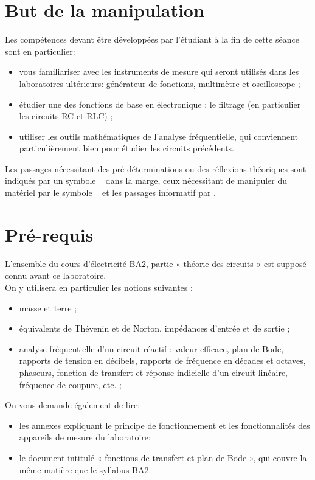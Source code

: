 \documentclass{../template/tp}
\author{The Fantastic Four} %
\begin{document}

\section{But de la manipulation}

Les compétences devant être développées par l'étudiant à la fin de cette séance sont en particulier:
\begin{itemize}
	\item vous familiariser avec les instruments de mesure qui seront utilisés dans les laboratoires ultérieurs: générateur de fonctions, multimètre et oscilloscope ;
	\item étudier une des fonctions de base en électronique : le filtrage (en particulier les circuits RC et RLC) ;
	\item utiliser les outils mathématiques de l'analyse fréquentielle, qui conviennent particulièrement bien pour étudier les
circuits précédents.
\end{itemize}


Les passages nécessitant des pré-déterminations ou des réflexions théoriques sont indiqués par un symbole \faCogs~ dans la marge,
ceux nécessitant de manipuler du matériel par le symbole \faFlask~ et les passages informatif par \faLightbulbO.

\section{Pré-requis}
L'ensemble du cours d'électricité BA2, partie « théorie des circuits » est supposé connu avant ce laboratoire.\\
On y utilisera en particulier les notions suivantes :
\begin{itemize}
\item masse et terre ; %
\item équivalents de Thévenin et de Norton, impédances d'entrée et de sortie ; %
\item analyse fréquentielle d'un circuit réactif : valeur efficace, plan de Bode, rapports de tension en
décibels, rapports de fréquence en décades et octaves, phaseurs, fonction de transfert et réponse indicielle d'un
circuit linéaire, fréquence de coupure, etc. ; %
\end{itemize}
On vous demande également de lire:
\begin{itemize}
\item les annexes expliquant le principe de fonctionnement et les fonctionnalités des appareils de mesure du laboratoire;
\item le document intitulé « fonctions de transfert et plan de Bode », qui couvre la même matière que le syllabus BA2.
\end{itemize}
\end{document}
